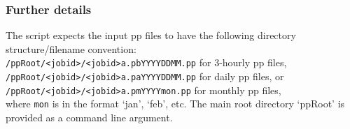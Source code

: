 \documentclass[10pt,a4paper]{article}
\newcommand\tab[1][0.5cm]{\hspace*{#1}}
\begin{document}
\subsubsection{Further details}
The script expects the input pp files to have the following directory structure/filename convention:\\
\tab \texttt{/ppRoot/<jobid>/<jobid>a.pbYYYYDDMM.pp} \hspace{1cm} for 3-hourly pp files,\\
\tab \texttt{/ppRoot/<jobid>/<jobid>a.paYYYYDDMM.pp} \hspace{1cm} for daily pp files, or\\
\tab \texttt{/ppRoot/<jobid>/<jobid>a.pmYYYYmon.pp} \hspace{1cm} for monthly pp files,\\
where \texttt{mon} is in the format `jan', `feb', etc.
The main root directory `ppRoot' is provided as a command line argument.\\\\
\end{document}
